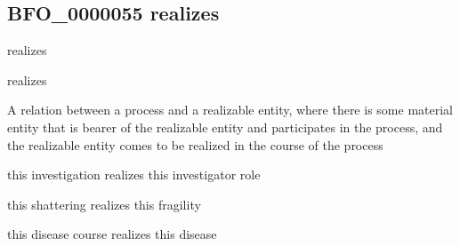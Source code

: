 \documentclass[letterpaper,10pt,english]{sphinxmanual}
\begin{document}
\subsection{BFO\_0000055 \sphinxhyphen{} realizes}
\label{\detokenize{doc-BFO_0000055:bfo-0000055-realizes}}\label{\detokenize{doc-BFO_0000055:index-0}}\label{\detokenize{doc-BFO_0000055::doc}}
\begin{sphinxShadowBox}

\sphinxAtStartPar
realizes
\end{sphinxShadowBox}

\begin{sphinxShadowBox}

\sphinxAtStartPar
realizes
\end{sphinxShadowBox}

\begin{sphinxShadowBox}

\sphinxAtStartPar
{}
\end{sphinxShadowBox}

\begin{sphinxShadowBox}

\sphinxAtStartPar
A relation between a process and a realizable entity, where there is some material entity that is bearer of the realizable entity and participates in the process, and the realizable entity comes to be realized in the course of the process
\end{sphinxShadowBox}

\begin{sphinxShadowBox}

\sphinxAtStartPar
this investigation realizes this investigator role

\sphinxAtStartPar
this shattering realizes this fragility

\sphinxAtStartPar
this disease course realizes this disease
\end{sphinxShadowBox}

\begin{sphinxShadowBox}

\sphinxAtStartPar
{}
\end{sphinxShadowBox}
\begin{quote}

\ignorespaces \end{quote}
\end{document}
